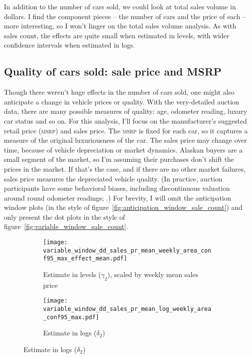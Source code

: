 \documentclass[11pt,letterpaper,oneside]{article}
\newcommand{\msrp}{\textsc{msrp}}
\begin{document}
\begin{doublespacing}
In addition to the number of cars sold, we could look at total sales volume in dollars.
I find the component pieces -- the number of cars and the price of each -- more interesting, so I won't linger on the total sales volume analysis.
As with sales count, the effects are quite small when estimated in levels, with wider confidence intervals when estimated in logs.

\subsection{Quality of cars sold: sale price and MSRP}
Though there weren't huge effects in the number of cars sold, one might also anticipate a change in vehicle prices or quality.
With the very\hyp{}detailed auction data, there are many possible measures of quality: age, odometer reading, luxury car status and so on.
For this analysis, I'll focus on the manufacturer's suggested retail price (\msrp{}) and sales price.
The \msrp{} is fixed for each car, so it captures a measure of the original luxuriousness of the car.
The sales price may change over time, because of vehicle depreciation or market dynamics.
Alaskan buyers are a small segment of the market, so I'm assuming their purchases don't shift the prices in the market.
If that's the case, and if there are no other market failures, sales price measures the depreciated vehicle quality.
(In practice, auction participants have some behavioral biases, including discontinuous valuation around round odometer readings; \cite{sallee2016consumers}.)
For brevity, I will omit the anticipation window plots (in the style of figure~\ref{fig:anticipation_window_sale_count}) and only present the dot plots in the style of figure~\ref{fig:variable_window_sale_count}.


\begin{figure}[!hbtp]
    \caption{Sales price effects with varying windows}
    \label{fig:variable_window_sales_price}
    \begin{subfigure}{0.97\linewidth}
        \caption{Estimate in levels ($\gamma_2$), scaled by weekly mean sales price}
        \texttt{[image: variable\_window\_dd\_sales\_pr\_mean\_weekly\_area\_conf95\_max\_effect\_mean.pdf]}
    \end{subfigure}
    \begin{subfigure}{0.97\linewidth}
        \caption{Estimate in logs ($\delta_2$)}
        \texttt{[image: variable\_window\_dd\_sales\_pr\_mean\_log\_weekly\_area\_conf95\_max.pdf]}
    \end{subfigure}


\end{figure}
\end{doublespacing}
\end{document}
